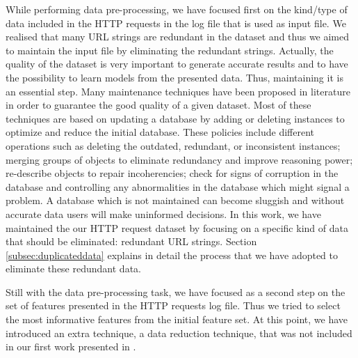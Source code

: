 \documentclass{llncs}
\begin{document}
While performing data pre-processing, we have focused first on the
kind/type of data included in the HTTP requests in the log file that is
used as input 
file. We realised  
 that many URL strings are redundant in the dataset and thus we aimed
 to maintain the input file %
 by eliminating the redundant
 strings. Actually, the quality of the dataset is very important to
 generate accurate results and to have the possibility to learn models
 from the presented data. %
 Thus, maintaining it is an essential
 step. %
Many maintenance techniques have been proposed in literature
\cite{wilson2001maintaining} in order to guarantee the good quality of
a given dataset.   Most of these techniques are based on updating a
database by adding or deleting instances to optimize and reduce the
initial database.  %
These policies include different operations such as deleting the
outdated, redundant, or inconsistent instances; merging groups of
objects to eliminate redundancy and improve reasoning power;
re-describe objects to repair incoherencies; check for signs of
corruption in the database and controlling any abnormalities in the
database which might signal a problem. A database which is not
maintained %
can become sluggish %
and without accurate data users will make uninformed decisions. In
this work, we have maintained the our HTTP request dataset by focusing
on a specific kind of data that should be eliminated:
redundant URL strings. Section \ref{subsec:duplicateddata} explains in
detail the process that we have adopted to eliminate these redundant
data.  

Still with the data pre-processing task, we have focused as a second
step on %
 the set of features presented in the HTTP requests log file. Thus
 we tried to select the most informative features from the initial
 feature set. At this point, we have introduced an extra technique, a
 data reduction technique, that was not included in our first work
 presented in \cite{ECTA}.  %
\end{document}
